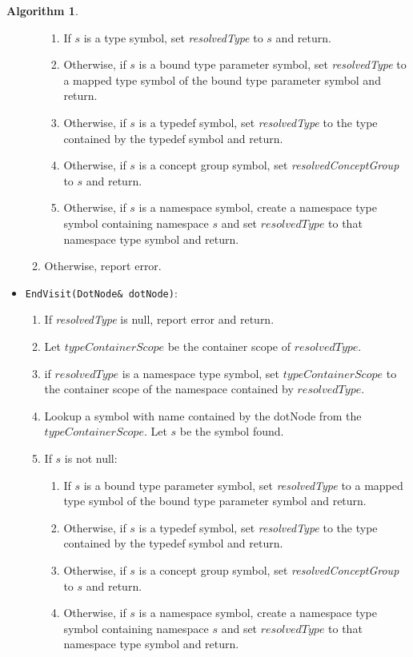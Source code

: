 \documentclass[a4paper,oneside,11pt]{book}
\theoremstyle{definition}
\newtheorem{algo}{Algorithm}[section]
\begin{document}
\begin{algo}
\begin{itemize}
\begin{enumerate}
\begin{enumerate}
\item
If $s$ is a type symbol, set \emph{resolvedType} to $s$ and return.
\item
Otherwise, if $s$ is a bound type parameter symbol, set \emph{resolvedType} to a mapped type symbol of the bound type parameter symbol and return.
\item
Otherwise, if $s$ is a typedef symbol, set \emph{resolvedType} to the type contained by the typedef symbol and return.
\item
Otherwise, if $s$ is a concept group symbol, set \emph{resolvedConceptGroup} to $s$ and return.
\item
Otherwise, if $s$ is a namespace symbol, create a namespace type symbol containing namespace $s$ and set $resolvedType$ to that namespace type symbol and return.
\end{enumerate}
\item
Otherwise, report error.
\end{enumerate}
\item
\verb|EndVisit(DotNode& dotNode)|:\\
\begin{enumerate}
\item
If \emph{resolvedType} is null, report error and return.
\item
Let $typeContainerScope$ be the container scope of $resolvedType$.
\item
if $resolvedType$ is a namespace type symbol, set $typeContainerScope$ to the container scope of the namespace contained by $resolvedType$.
\item
Lookup a symbol with name contained by the dotNode from the $typeContainerScope$. Let $s$ be the symbol found.
\item
If $s$ is not null:
\begin{enumerate}
\item
If $s$ is a bound type parameter symbol, set \emph{resolvedType} to a mapped type symbol of the bound type parameter symbol and return.
\item
Otherwise, if $s$ is a typedef symbol, set \emph{resolvedType} to the type contained by the typedef symbol and return.
\item
Otherwise, if $s$ is a concept group symbol, set \emph{resolvedConceptGroup} to $s$ and return.
\item
Otherwise, if $s$ is a namespace symbol, create a namespace type symbol containing namespace $s$ and set $resolvedType$ to that namespace type symbol and return.
\end{enumerate}

\end{enumerate}
\end{itemize}
\end{algo}
\end{document}
